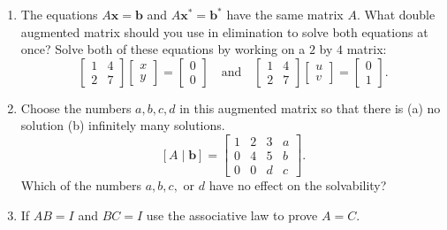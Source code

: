 \documentclass[14pt, a4paper]{article}
\begin{document}
\begin{enumerate}[resume]
    \item The equations $A\boldsymbol{x} = \boldsymbol{b}$ and $A\boldsymbol{x}^* = \boldsymbol{b}^*$ have the same matrix $A$. What double augmented matrix should you use in elimination to solve both equations at once? Solve both of these equations by working on a $2$ by $4$ matrix:
          \[
              \begin{bmatrix}
                  1 & 4 \\
                  2 & 7
              \end{bmatrix}
              \begin{bmatrix}
                  x \\ y
              \end{bmatrix}
              =
              \begin{bmatrix}
                  0 \\ 0
              \end{bmatrix}
              \quad\text{and}\quad
              \begin{bmatrix}
                  1 & 4 \\
                  2 & 7
              \end{bmatrix}
              \begin{bmatrix}
                  u \\ v
              \end{bmatrix}
              =
              \begin{bmatrix}
                  0 \\ 1
              \end{bmatrix}.
          \]

    \item Choose the numbers $a,b,c,d$ in this augmented matrix so that there is (a) no solution (b) infinitely many solutions.
          \[
              [A\mid\boldsymbol{b}] =
              \begin{bmatrix}
                  1 & 2 & 3 & a \\
                  0 & 4 & 5 & b \\
                  0 & 0 & d & c
              \end{bmatrix}.
          \]
          Which of the numbers $a,b,c,$ or $d$ have no effect on the solvability?

    \item If $AB = I$ and $BC = I$ use the associative law to prove $A = C$.
\end{enumerate}
\end{document}
